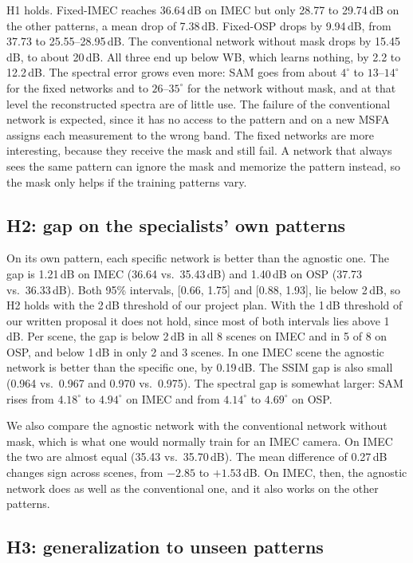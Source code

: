 \documentclass{article}
\begin{document}
H1 holds. Fixed-IMEC reaches 36.64\,dB on IMEC but only 28.77 to
29.74\,dB on the other patterns, a mean drop of 7.38\,dB. Fixed-OSP drops by
9.94\,dB, from 37.73 to 25.55--28.95\,dB. The conventional network without
mask drops by 15.45\,dB, to about 20\,dB. All three end up below WB, which
learns nothing, by 2.2 to 12.2\,dB. The spectral error grows even more: SAM
goes from about $4^\circ$ to $13$--$14^\circ$ for the fixed networks and to
$26$--$35^\circ$ for the network without mask, and at that level the
reconstructed spectra are of little use. The failure of the conventional
network is expected, since it has no access to the pattern and on a new MSFA
assigns each measurement to the wrong band. The fixed networks are more
interesting, because they receive the mask and still fail. A network that
always sees the same pattern can ignore the mask and memorize the pattern
instead, so the mask only helps if the training patterns vary.

\subsection{H2: gap on the specialists' own patterns}

On its own pattern, each specific network is better than the agnostic one.
The gap is 1.21\,dB on IMEC (36.64 vs.\ 35.43\,dB) and 1.40\,dB on OSP
(37.73 vs.\ 36.33\,dB). Both 95\% intervals, [0.66, 1.75] and [0.88, 1.93],
lie below 2\,dB, so H2 holds with the 2\,dB threshold of our project plan.
With the 1\,dB threshold of our written proposal it does not hold, since
most of both intervals lies above 1\,dB. Per scene, the gap is below 2\,dB
in all 8 scenes on IMEC and in 5 of 8 on OSP, and below 1\,dB in only 2 and
3 scenes. In one IMEC scene the agnostic network is better than the specific
one, by 0.19\,dB. The SSIM gap is also small (0.964 vs.\ 0.967 and 0.970
vs.\ 0.975). The spectral gap is somewhat larger: SAM rises from
$4.18^\circ$ to $4.94^\circ$ on IMEC and from $4.14^\circ$ to $4.69^\circ$ on
OSP.

We also compare the agnostic network with the conventional network without
mask, which is what one would normally train for an IMEC camera. On IMEC the
two are almost equal (35.43 vs.\ 35.70\,dB). The mean difference of
0.27\,dB changes sign across scenes, from $-2.85$ to $+1.53$\,dB. On IMEC,
then, the agnostic network does as well as the conventional one, and it
also works on the other patterns.

\subsection{H3: generalization to unseen patterns}
\end{document}
